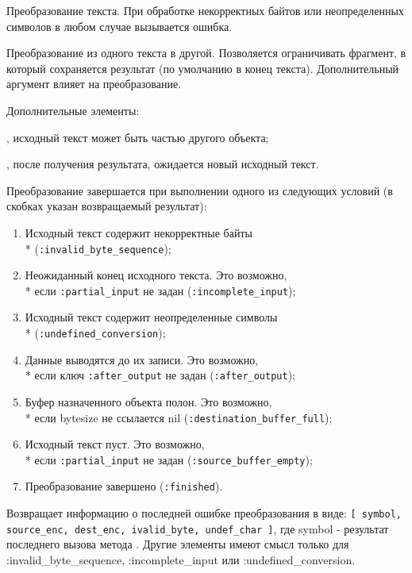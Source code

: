 \begin{methodlist}
  Преобразование текста. При обработке некорректных байтов или неопределенных символов в любом случае вызывается ошибка. 
 
  Преобразование из одного текста в другой. Позволяется ограничивать фрагмент, в который сохраняется результат (по умолчанию в конец текста). Дополнительный аргумент влияет на преобразование.

  \begin{keylist}{Дополнительные элементы:}
    
    , исходный текст может быть частью другого объекта;          
    
    , после получения результата, ожидается новый исходный текст.
  \end{keylist}
 
  Преобразование завершается при выполнении одного из следующих условий (в скобках указан возвращаемый результат):
  \begin{enumerate}
    \item Исходный текст содержит некорректные байты \\* (\verb!:invalid_byte_sequence!);
    \item Неожиданный конец исходного текста. Это возможно, \\* если \verb!:partial_input! не задан (\verb!:incomplete_input!);
    \item Исходный текст содержит неопределенные символы \\* (\verb!:undefined_conversion!);
    \item Данные выводятся до их записи. Это возможно, \\* если ключ \verb!:after_output! не задан (\verb!:after_output!);
    \item Буфер назначенного объекта полон. Это возможно, \\* если bytesize не ссылается nil (\verb!:destination_buffer_full!);
    \item Исходный текст пуст. Это возможно, \\* если \verb!:partial_input! не задан (\verb!:source_buffer_empty!);
    \item Преобразование завершено (\verb!:finished!).
  \end{enumerate}

  Возвращает информацию о последней ошибке преобразования в виде:
  \verb![ symbol, source_enc, dest_enc, ivalid_byte, undef_char ]!, где symbol - результат последнего вызова метода . Другие элементы имеют смысл только для :invalid_byte_sequence, :incomplete_input или :undefined_conversion.
 

\end{methodlist}

